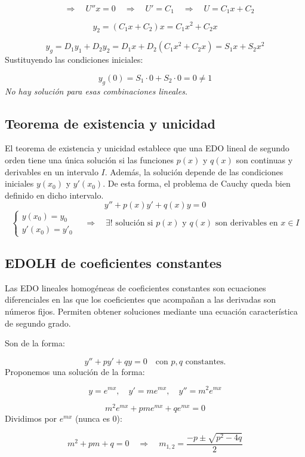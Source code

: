 \documentclass[a4paper,12pt]{article}
\begin{document}
\[
\quad \Rightarrow \quad 
U''x = 0 
\quad \Rightarrow \quad 
U' = C_1 
\quad \Rightarrow \quad 
U = C_1x + C_2
\]

\[
y_2 = (C_1x + C_2)x = C_1x^2 + C_2x
\]

\[
y_g = D_1y_1 + D_2y_2 = D_1x + D_2(C_1x^2 + C_2x) = S_1x + S_2x^2
\]
Sustituyendo las condiciones iniciales:

\[
y_g(0) = S_1 \cdot 0 + S_2 \cdot 0 = 0 \neq 1 
\]
\textit{No hay solución para esas combinaciones lineales.}

\newpage
\subsection{Teorema de existencia y unicidad}
\noindent
El teorema de existencia y unicidad establece que una EDO lineal de segundo orden tiene una única solución si las funciones \( p(x) \) y \( q(x) \) son continuas y derivables en un intervalo \( I \).  
Además, la solución depende de las condiciones iniciales \( y(x_0) \) y \( y'(x_0) \).  
De esta forma, el problema de Cauchy queda bien definido en dicho intervalo.
\[
y'' + p(x)y' + q(x)y = 0
\]
\[
\begin{cases}
y(x_0) = y_0 \\
y'(x_0) = y'_0
\end{cases}
\quad \Rightarrow \quad 
\exists ! \text{ solución si } p(x) \text{ y } q(x) \text{ son derivables en } x \in I
\]

\subsection{EDOLH de coeficientes constantes}
\noindent
Las EDO lineales homogéneas de coeficientes constantes son ecuaciones diferenciales en las que los coeficientes que acompañan a las derivadas son números fijos.    
Permiten obtener soluciones mediante una ecuación característica de segundo grado.

\medskip
\noindent
Son de la forma:

\[
y'' + p y' + q y = 0
\quad \text{con } p, q \text{ constantes.}
\]
Proponemos una solución de la forma:

\[
y = e^{mx}, \quad y' = m e^{mx}, \quad y'' = m^2 e^{mx}
\]

\[
m^2 e^{mx} + p m e^{mx} + q e^{mx} = 0 
\]
Dividimos por \( e^{mx} \) (nunca es 0):

\[
m^2 + p m + q = 0
\quad \Longrightarrow \quad
m_{1,2} = \frac{-p \pm \sqrt{p^2 - 4q}}{2}
\]
\end{document}
